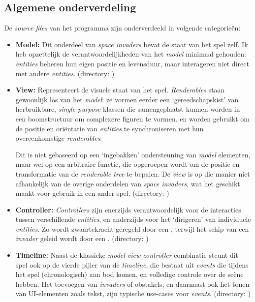 \documentclass[10pt,a4paper]{article}
\begin{document}
\subsection{Algemene onderverdeling}
De \emph{source files} van het programma zijn onderverdeeld in volgende 
categorie\"en:
\begin{itemize}
\item \textbf{Model:} Dit onderdeel van \emph{space invaders} bevat de staat van het 
spel zelf. Ik heb opzettelijk de verantwoordelijkheden van het \emph{model} minimaal 
gehouden: \emph{entities} beheren hun eigen positie en levensduur, maar interageren 
niet direct met andere \emph{entities}. 
(directory: )

\item \textbf{View:} Representeert de visuele staat van het spel. \emph{Renderables} 
staan gewoonlijk los van het \emph{model}: ze vormen eerder een
`gereedschapskist' van herbruikbare, \emph{single-purpose} klassen die samengeplaatst 
kunnen worden in een boomstructuur om complexere figuren te vormen.  en  worden gebruikt om 
de positie en ori\"entatie van \emph{entities} te synchroniseren met hun 
overeenkomstige \emph{renderables}. 

Dit is niet gebaseerd op een `ingebakken' 
ondersteuning van \emph{model} elementen, maar wel op een arbitraire 
functie, die opgeroepen wordt om de positie en transformatie van de \emph{renderable 
tree} te bepalen. De \emph{view} is op die manier niet afhankelijk van de overige
onderdelen van \emph{space invaders}, wat het geschikt maakt voor gebruik in 
een ander spel. 
(directory: )

\item \textbf{Controller:} \emph{Controllers} zijn enerzijds verantwoordelijk voor 
de interacties tussen verschillende \emph{entities}, en anderzijds voor het 
`dirigeren' van individuele \emph{entities}. Zo wordt zwaartekracht geregeld door
een , terwijl het schip van een \emph{invader} geleid wordt 
door een . 
(directory: )

\item \textbf{Timeline:} Naast de klassieke \emph{model-view-controller} 
combinatie steunt dit spel ook op de vierde pijler van de \emph{timeline}, 
die bestaat uit \emph{events} die tijdens het spel (chronologisch) aan 
bod komen, en
volledige controle over de sc\`ene hebben. Het toevoegen van \emph{invaders} of 
obstakels, en daarnaast ook het tonen van UI-elementen zoals tekst, zijn
typische use-cases voor \emph{events}.
(directory: )


\end{itemize}
\end{document}
